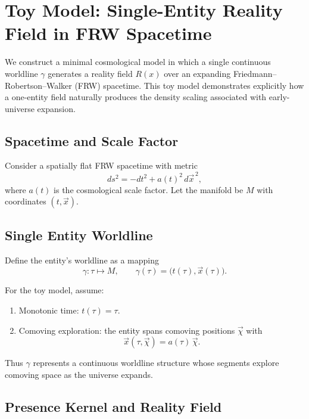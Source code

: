 \section{Toy Model: Single-Entity Reality Field in FRW Spacetime}

We construct a minimal cosmological model in which a single continuous worldline
$\gamma$ generates a reality field $R(x)$ over an expanding Friedmann--Robertson--Walker
(FRW) spacetime. This toy model demonstrates explicitly how a one-entity field
naturally produces the density scaling associated with early-universe expansion.

\subsection{Spacetime and Scale Factor}

Consider a spatially flat FRW spacetime with metric
\begin{equation}
ds^2 = -dt^2 + a(t)^2\, d\vec{x}^{\,2},
\end{equation}
where $a(t)$ is the cosmological scale factor. Let the manifold be $M$ with coordinates
$(t,\vec{x})$.

\subsection{Single Entity Worldline}

Define the entity's worldline as a mapping
\begin{equation}
\gamma : \tau \mapsto M, \qquad
\gamma(\tau) = \big(t(\tau), \vec{x}(\tau)\big).
\end{equation}

For the toy model, assume:
\begin{enumerate}
\item Monotonic time: $t(\tau) = \tau$.
\item Comoving exploration: the entity spans comoving positions $\vec{\chi}$ with
\begin{equation}
\vec{x}(\tau,\vec{\chi}) = a(\tau)\,\vec{\chi}.
\end{equation}
\end{enumerate}

Thus $\gamma$ represents a continuous worldline structure whose segments explore
comoving space as the universe expands.

\subsection{Presence Kernel and Reality Field}

